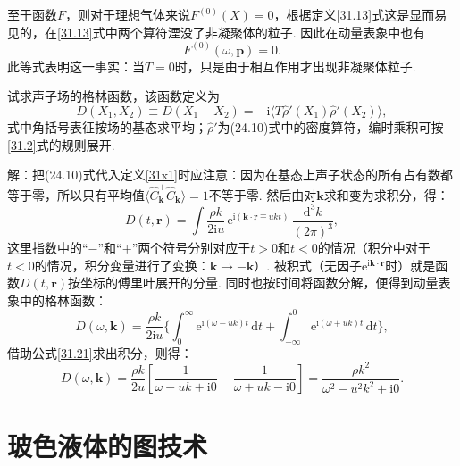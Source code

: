 至于函数$F$，则对于理想气体来说$F^{(0)}(X)=0$，根据定义\eqref{31.13}式这是显而易见的，在\eqref{31.13}式中两个算符湮没了非凝聚体的粒子. 因此在动量表象中也有
\begin{equation}
F^{(0)}(\omega,\bm{p})=0.
\label{31.23}
\end{equation}
此等式表明这一事实：当$T=0$时，只是由于相互作用才出现非凝聚体粒子.

\begin{xiti}

试求声子场的格林函数，该函数定义为
\begin{equation}
D(X_{1},X_{2})\equiv D(X_{1}-X_{2})
=-\mathrm{i}\langle T\hat{\rho}'(X_{1})\hat{\rho}'(X_{2})\rangle,
\label{31x1}
\end{equation}
式中角括号表征按场的基态求平均；$\hat{\rho}'$为(24.10)式中的密度算符，编时乘积可按\eqref{31.2}式的规则展开.

{\heiti 解：}把(24.10)式代入定义\eqref{31x1}时应注意：因为在基态上声子状态的所有占有数都等于零，所以只有平均值$\langle\hat{C}^{+}_{\bm{k}}\hat{C}_{\bm{k}}\rangle=1$不等于零. 然后由对$\bm{k}$求和变为求积分，得：
\begin{equation*}
D(t,\bm{r})=\int\frac{\rho k}{2\mathrm{i}u}\,
\mathrm{e}^{\mathrm{i}(\bm{k}\cdot\bm{r}\mp ukt)}\,\frac{\mathrm{d}^{3}k}{(2\pi)^{3}},
\end{equation*}
这里指数中的“$-$”和“$+$”两个符号分别对应于$t>0$和$t<0$的情况（积分中对于$t<0$的情况，积分变量进行了变换：$\bm{k}\to-\bm{k}$）. 被积式（无因子$\mathrm{e}^{\mathrm{i}\bm{k}\cdot\bm{r}}$时）就是函数$D(t,\bm{r})$按坐标的傅里叶展开的分量. 同时也按时间将函数分解，便得到动量表象中的格林函数：
\begin{equation*}
D(\omega,\bm{k})=\frac{\rho k}{2\mathrm{i}u}
\bigg\{\int_{0}^{\infty}\mathrm{e}^{\mathrm{i}(\omega-uk)t}\,\mathrm{d}t
+\int_{-\infty}^{0}\mathrm{e}^{\mathrm{i}(\omega+uk)t}\,\mathrm{d}t\bigg\},
\end{equation*}
借助公式\eqref{31.21}求出积分，则得：
\begin{equation*}
D(\omega,\bm{k})=\frac{\rho k}{2u}\left[
\frac{1}{\omega-uk+\mathrm{i}0}-\frac{1}{\omega+uk-\mathrm{i}0}\right]
=\frac{\rho k^{2}}{\omega^{2}-u^{2}k^{2}+\mathrm{i}0}.
\end{equation*}

\end{xiti}

\section{玻色液体的图技术}

